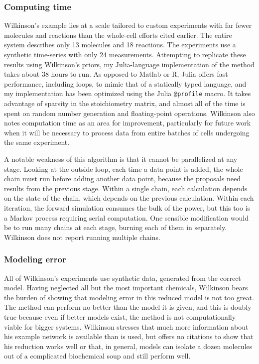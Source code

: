 \documentclass{article}
\begin{document}
\subsubsection{Computing time}
Wilkinson's example lies at a scale tailored to custom experiments with far fewer molecules and reactions than the whole-cell efforts cited earlier. The entire system describes only 13 molecules and 18 reactions. The experiments use a synthetic time-series with only 24 measurements. Attempting to replicate these results using Wilkinson's priors, my Julia-language implementation of the method takes about 38 hours to run. As opposed to Matlab or R, Julia offers fast performance, including loops, to mimic that of a statically typed language, and my implementation has been optimized using the Julia \texttt{@profile} macro. It takes advantage of sparsity in the stoichiometry matrix, and almost all of the time is spent on random number generation and floating-point operations. Wilkinson also notes computation time as an area for improvement, particularly for future work when it will be necessary to process data from entire batches of cells undergoing the same experiment.

A notable weakness of this algorithm is that it cannot be parallelized at any stage. Looking at the outside loop, each time a data point is added, the whole chain must  run before adding another data point, because the proposals need results from the previous stage. Within a single chain, each calculation depends on the state of the chain, which depends on the previous calculation. Within each iteration, the forward simulation consumes the bulk of the power, but this too is a Markov process requiring serial computation. One sensible modification would be to run many chains at each stage, burning each of them in separately. Wilkinson does not report running multiple chains.

\subsubsection{Modeling error}
All of Wilkinson's experiments use synthetic data, generated from the correct model. Having neglected all but the most important chemicals, Wilkinson bears the burden of showing that modeling error in this reduced model is not too great. The method can perform no better than the model it is given, and this is doubly true because even if better models exist, the method is not computationally viable for bigger systems. Wilkinson stresses that much more information about his example network is available than is used, but offers no citations to show that his reduction works well or that, in general, models can isolate a dozen molecules out of a complicated biochemical soup and still perform well.
\end{document}
